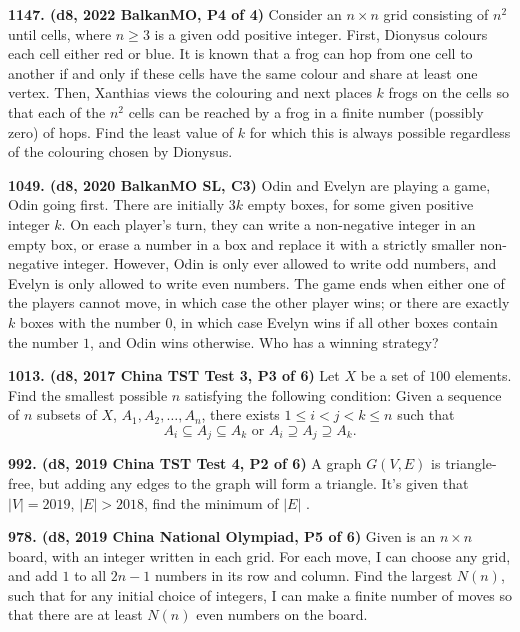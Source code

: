 \documentclass{article}
\begin{document}
\textbf{1147. (\color{red}d8\color{black}, 2022 BalkanMO, P4 of 4)} Consider an $n \times n$ grid consisting of $n^2$ until cells, where $n \geq 3$ is a given odd positive integer. First, Dionysus colours each cell either red or blue. It is known that a frog can hop from one cell to another if and only if these cells have the same colour and share at least one vertex. Then, Xanthias views the colouring and next places $k$ frogs on the cells so that each of the $n^2$ cells can be reached by a frog in a finite number (possibly zero) of hops. Find the least value of $k$ for which this is always possible regardless of the colouring chosen by Dionysus.

\textbf{1049. (\color{red}d8\color{black}, 2020 BalkanMO SL, C3)} Odin and Evelyn are playing a game, Odin going first. There are initially $3k$ empty boxes, for some given positive integer $k$. On each player's turn, they can write a non-negative integer in an empty box, or erase a number in a box and replace it with a strictly smaller non-negative integer. However, Odin is only ever allowed to write odd numbers, and Evelyn is only allowed to write even numbers. The game ends when either one of the players cannot move, in which case the other player wins; or there are exactly $k$ boxes with the number $0$, in which case Evelyn wins if all other boxes contain the number $1$, and Odin wins otherwise. Who has a winning strategy?

\textbf{1013. (\color{red}d8\color{black}, 2017 China TST Test 3, P3 of 6)} Let $X$ be a set of $100$ elements. Find the smallest possible $n$ satisfying the following condition: Given a sequence of $n$ subsets of $X$, $A_1,A_2,\ldots,A_n$, there exists $1 \leq i < j < k \leq n$ such that $$A_i \subseteq A_j \subseteq A_k \text{ or } A_i \supseteq A_j \supseteq A_k.$$

\textbf{992. (\color{red}d8\color{black}, 2019 China TST Test 4, P2 of 6)} A graph $G(V,E)$ is triangle-free, but adding any edges to the graph will form a triangle. It's given that $|V|=2019$, $|E|>2018$, find the minimum of $|E|$ .

\textbf{978. (\color{red}d8\color{black}, 2019 China National Olympiad, P5 of 6)} Given is an $n\times n$ board, with an integer written in each grid. For each move, I can choose any grid, and add $1$ to all $2n-1$ numbers in its row and column. Find the largest $N(n)$, such that for any initial choice of integers, I can make a finite number of moves so that there are at least $N(n)$ even numbers on the board.
\end{document}
